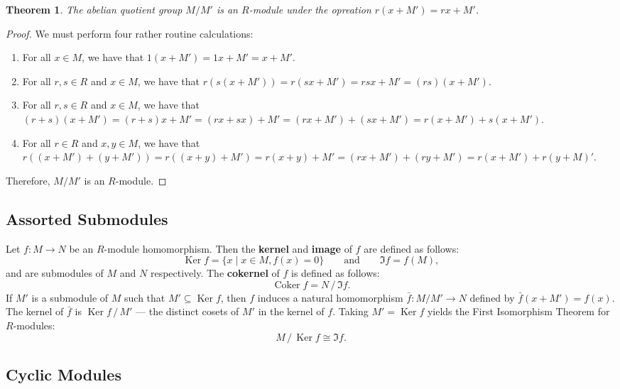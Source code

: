 \documentclass[11pt]{article}
\newtheorem{theorem}{Theorem}
\newcommand{\Ker}{\operatorname{Ker}}
\newcommand{\Coker}{\operatorname{Coker}}
\begin{document}
\begin{adjustwidth}{1cm}{}
	\begin{theorem}
		The abelian quotient group $M / M'$ is an $R$-module under the opreation $r(x + M') = rx + M'$.
	\end{theorem}
	\begin{proof}
		We must perform four rather routine calculations:
		\begin{enumerate}
			\item For all $x \in M$, we have that $1(x + M') = 1x + M' = x + M'$.
			\item For all $r, s \in R$ and $x \in M$, we have that $r(s(x + M')) = r(sx + M') = rsx + M' = (rs)(x + M')$.
			\item For all $r, s \in R$ and $x \in M$, we have that $(r + s)(x + M') = (r + s)x + M' = (rx + sx) + M' = (rx + M') + (sx + M') = r(x + M') + s(x + M')$.
			\item For all $r \in R$ and $x, y \in M$, we have that $r((x + M') + (y + M')) = r((x + y) + M') = r(x + y) + M' = (rx + M') + (ry + M') = r(x + M') + r(y + M)'$.
		\end{enumerate}
		Therefore, $M / M'$ is an $R$-module.
	\end{proof}
\end{adjustwidth}


\subsection{Assorted Submodules}

Let $f : M \to N$ be an $R$-module homomorphism. Then the \textbf{kernel} and \textbf{image} of $f$ are defined as follows:
\[
	\Ker f = \{ x \mid x \in M, f(x) = 0 \} \qquad \text{and} \qquad \Im f = f(M),
\]
and are submodules of $M$ and $N$ respectively. The \textbf{cokernel} of $f$ is defined as follows:
\[
	\Coker f = N \,/\, \Im f.
\]
If $M'$ is a submodule of $M$ such that $M' \subseteq \Ker f$, then $f$ induces a natural homomorphism $\bar{f} : M / M' \to N$ defined by $\bar{f}(x + M') = f(x)$. The kernel of $\bar{f}$ is $\Ker f \,/\, M'$ --- the distinct cosets of $M'$ in the kernel of $f$. Taking $M' = \Ker f$ yields the First Isomorphism Theorem for $R$-modules:
\[
	M \,/\, \Ker f \cong \Im f.
\]

\newpage


\subsection{Cyclic Modules}
\end{document}
